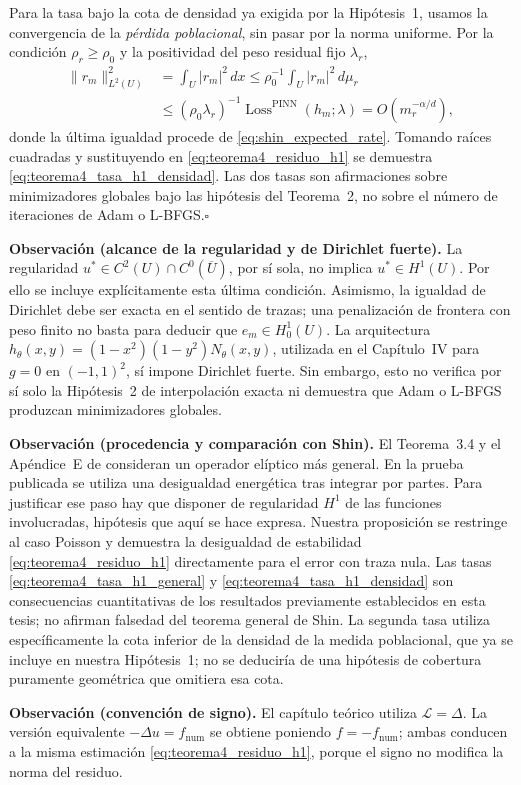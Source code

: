 Para la tasa bajo la cota de densidad ya exigida por la Hipótesis~1, usamos la
convergencia de la \emph{pérdida poblacional}, sin pasar por la norma
uniforme. Por la condición $\rho_r\ge\rho_0$ y la positividad del
peso residual fijo $\lambda_r$,
\[
\begin{aligned}
\|r_m\|_{L^2(U)}^2
&=\int_U|r_m|^2\,dx
\le\rho_0^{-1}\int_U|r_m|^2\,d\mu_r\\
&\le(\rho_0\lambda_r)^{-1}
\operatorname{Loss}^{\mathrm{PINN}}(h_m;\lambda)
=O\!\left(m_r^{-\alpha/d}\right),
\end{aligned}
\]
donde la última igualdad procede de
\eqref{eq:shin_expected_rate}. Tomando raíces cuadradas y
sustituyendo en \eqref{eq:teorema4_residuo_h1} se demuestra
\eqref{eq:teorema4_tasa_h1_densidad}.
Las dos tasas son afirmaciones sobre minimizadores globales bajo las
hipótesis del Teorema~2, no sobre el número de iteraciones de Adam o
L-BFGS.\hfill$\square$

\medskip
\noindent\textbf{Observación (alcance de la regularidad y de Dirichlet fuerte).}
La regularidad $u^*\in C^2(U)\cap C^0(\overline U)$, por sí sola,
no implica $u^*\in H^1(U)$. Por ello se incluye explícitamente
esta última condición. Asimismo, la igualdad de Dirichlet debe ser
exacta en el sentido de trazas; una penalización de frontera con peso
finito no basta para deducir que $e_m\in H_0^1(U)$.
La arquitectura $h_\theta(x,y)=(1-x^2)(1-y^2)N_\theta(x,y)$,
utilizada en el Capítulo~IV para $g=0$ en $(-1,1)^2$, sí
impone Dirichlet fuerte. Sin embargo, esto no verifica por sí solo
la Hipótesis~2 de interpolación exacta ni demuestra que Adam o
L-BFGS produzcan minimizadores globales.

\medskip
\noindent\textbf{Observación (procedencia y comparación con Shin).}
El Teorema~3.4 y el Apéndice~E de \cite{shin2020convergence}
consideran un operador elíptico más general. En la prueba publicada
se utiliza una desigualdad energética tras integrar por partes.
Para justificar ese paso hay que disponer de regularidad $H^1$
de las funciones involucradas, hipótesis que aquí se hace expresa.
Nuestra proposición se restringe al caso Poisson y demuestra
la desigualdad de estabilidad \eqref{eq:teorema4_residuo_h1}
directamente para el error con traza nula. Las tasas
\eqref{eq:teorema4_tasa_h1_general} y
\eqref{eq:teorema4_tasa_h1_densidad} son consecuencias
cuantitativas de los resultados previamente establecidos en esta
tesis; no afirman falsedad del teorema general de Shin.
La segunda tasa utiliza específicamente la cota inferior de la
densidad de la medida poblacional, que ya se incluye en nuestra
Hipótesis~1; no se deduciría de una hipótesis de cobertura puramente
geométrica que omitiera esa cota.

\medskip
\noindent\textbf{Observación (convención de signo).}
El capítulo teórico utiliza $\mathcal L=\Delta$.
La versión equivalente $-\Delta u=f_{\mathrm{num}}$ se obtiene
poniendo $f=-f_{\mathrm{num}}$; ambas conducen a la misma
estimación \eqref{eq:teorema4_residuo_h1}, porque el signo no
modifica la norma del residuo.
